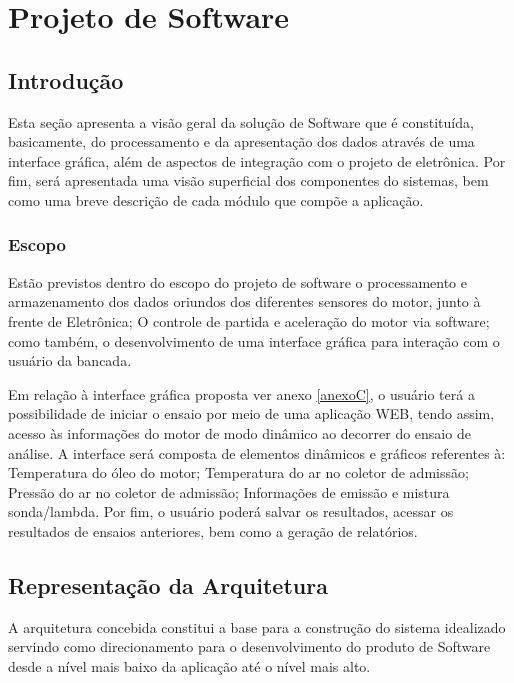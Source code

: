 \chapter[Projeto de Software]{Projeto de Software}

\section{Introdução}

Esta seção apresenta a visão geral da solução de Software que é constituída, basicamente, do processamento e da apresentação dos dados através de uma interface gráfica, além de aspectos de integração com o projeto de eletrônica. Por fim, será apresentada uma visão superficial dos componentes do sistemas, bem como uma breve descrição de cada módulo que compõe a aplicação. 

\subsection{Escopo}

Estão previstos dentro do escopo do projeto de software o processamento e armazenamento dos dados oriundos dos diferentes sensores do motor, junto à frente de Eletrônica; O controle de partida e aceleração do motor via software; como também, o desenvolvimento de uma interface gráfica para interação com o usuário da bancada.

Em relação à interface gráfica proposta ver anexo \ref{anexoC}, o usuário terá a possibilidade de iniciar o ensaio por meio de uma aplicação WEB, tendo assim, acesso às informações do motor de modo dinâmico ao decorrer do ensaio de análise. A interface será composta de elementos dinâmicos e gráficos referentes à: Temperatura do óleo do motor; Temperatura do ar no coletor de admissão; Pressão do ar no coletor de admissão; Informações de emissão e mistura sonda/lambda. Por fim, o usuário poderá salvar os resultados, acessar os resultados de ensaios anteriores, bem como a geração de relatórios.

\section{Representação da Arquitetura}

A arquitetura concebida constitui a base para a construção do sistema idealizado servindo como direcionamento para o desenvolvimento do produto de Software desde a nível mais baixo da aplicação até o nível mais alto.


